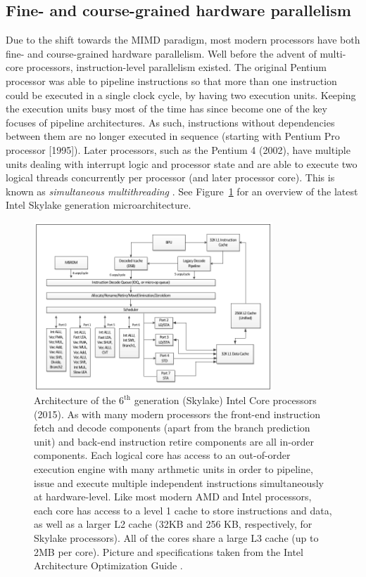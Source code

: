 \subsection{Fine- and course-grained hardware parallelism}
Due to the shift towards the MIMD paradigm, most modern processors have both fine- and course-grained hardware parallelism. Well before the advent of multi-core processors, instruction-level parallelism
existed. The original Pentium processor was able to pipeline instructions so that more than one instruction could be executed in a single clock cycle, by having two execution units. Keeping the execution units
busy most of the time has since become one of the key focuses of pipeline architectures. As such, instructions without dependencies between them are no longer executed in sequence (starting with Pentium 
Pro processor [1995]). Later processors, such as the Pentium 4 (2002), have multiple units dealing with interrupt logic and processor state and are able to execute two logical threads concurrently per 
processor (and later processor core). This is known as \textit{simultaneous multithreading} \cite{gerber2002software,akhter2006multi}. See Figure~\ref{fig_cpu_arch_skylake} for an overview of the latest 
Intel Skylake generation microarchitecture.
\begin{figure}[ht!]
 \begin{mdframed}
  \centering
  \includegraphics[width=0.8\textwidth]{images/cpu_intel_skylake.png}
  \caption[Intel Skylake Generation Architecture]{Architecture of the $6^\text{th}$ generation (Skylake) Intel Core processors (2015). As with many modern processors the front-end instruction fetch and decode components (apart from 
  the branch prediction unit) and back-end instruction retire components are all in-order components. Each logical core has access to an out-of-order execution engine with many arthmetic units in order to pipeline, issue and 
  execute multiple independent instructions simultaneously at hardware-level. Like most modern AMD and Intel processors, each core has access to a level 1 cache to store instructions and data, as well as a larger L2 
  cache (32KB and 256 KB, respectively, for Skylake processors). All of the cores share a large L3 cache (up to 2MB per core). Picture and specifications taken from the Intel Architecture Optimization Guide \cite{intelArch}.}
  \label{fig_cpu_arch_skylake}
 \end{mdframed}
\end{figure}

